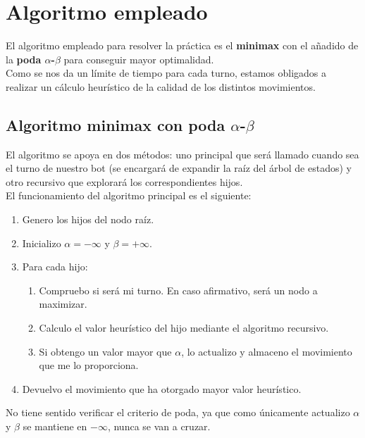 \documentclass[12pt,spanish]{article}
\begin{document}
\section{Algoritmo empleado}

El algoritmo empleado para resolver la práctica es el \textbf{minimax} con el añadido de la \textbf{poda $\alpha$-$\beta$} para conseguir mayor optimalidad.\\

Como se nos da un límite de tiempo para cada turno, estamos obligados a realizar un cálculo heurístico de la calidad de los distintos movimientos. 


\subsection{Algoritmo minimax con poda $\alpha$-$\beta$}

El algoritmo se apoya en dos métodos: uno principal que será llamado cuando sea el turno de nuestro bot (se encargará de expandir la raíz del árbol de estados) y otro recursivo que explorará los correspondientes hijos.\\

El funcionamiento del algoritmo principal es el siguiente:

\begin{enumerate}
	\item Genero los hijos del nodo raíz.
	\item Inicializo $\alpha=-\infty$ y $\beta=+\infty$.
	\item Para cada hijo:
		\begin{enumerate}[label=3.\arabic*]
			\item Compruebo si será mi turno. En caso afirmativo, será un nodo a maximizar.
			\item Calculo el valor heurístico del hijo mediante el algoritmo recursivo.
			\item Si obtengo un valor mayor que $\alpha$, lo actualizo y almaceno el movimiento que me lo proporciona.
		\end{enumerate}
		\item Devuelvo el movimiento que ha otorgado mayor valor heurístico.
\end{enumerate}

No tiene sentido verificar el criterio de poda, ya que como únicamente actualizo $\alpha$  y $\beta$ se mantiene en $-\infty$, nunca se van a cruzar.
\end{document}
